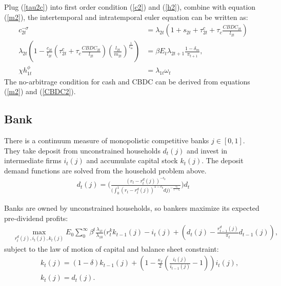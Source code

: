 \documentclass[12pt]{article}
\begin{document}
Plug (\ref{tau2c}) into first order condition (\ref{c2}) and  (\ref{h2}), combine with equation (\ref{m2}), the intertemporal and intratemporal euler equation can be written as: 
\begin{align*}
c_{2t}^{-\sigma} &= \lambda_{2t}(1+s_{2t}+\tau_{2t}^c+\tau_c\frac{CBDC_{2t}}{l_{2t}}) \\
\lambda_{2t}(1-\frac{c_{2t}}{l_{2t}}(\tau_{2t}^c+\tau_c\frac{CBDC_{2t}}{l_{2t}})(\frac{l_{2t}}{m_{2t}})^{\frac{1}{\epsilon_m}}) &= \beta E_t \lambda_{2t+1} \frac{1-\delta_m}{\pi_{t+1}}, \\
\chi h_{1t}^{\phi} &= \lambda_{1t}\omega_t 
\end{align*}
The no-arbitrage condition for cash and CBDC can be derived from equations (\ref{m2}) and (\ref{CBDC2}).

\subsection{Bank}
There is a continuum measure of monopolistic competitive banks $j \in [0,1]$. They take deposit from unconstrained households $d_{t}(j)$ and invest in intermediate firms $i_t(j)$ and accumulate capital stock $k_t(j)$. The deposit demand functions are solved from the household problem above. 
\begin{align*}
d_{t}(j) = \Biggl(\frac{(r_t-r_t^d(j))^{-\epsilon_b}}{\big(\int_0^1(r_t-r_t^d(j))^{1-\epsilon_b}dj\big)^{-\frac{\epsilon_b}{1-\epsilon_b}}}\Biggl)d_{t} 
\end{align*}

Banks are owned by unconstrained households, so bankers maximize its expected pre-dividend profits: 
\begin{align*}
 &\max_{r_t^d(j),i_t(j),k_t(j)}E_0 \sum_0^{\infty}\beta^t\frac{\lambda_{1t}}{\lambda_{10}}(r_t^kk_{t-1}(j)-i_t(j)+(d_{t}(j)-\frac{r_{t-1}^d(j)}{\pi_t}d_{t-1}(j)),
 \end{align*}
subject to the law of motion of capital and balance sheet constraint: 
 \begin{align*}
  \quad & k_t(j) = (1-\delta)k_{t-1}(j)+(1-\frac{\kappa_I}{2}(\frac{i_t(j)}{i_{t-1}(j)}-1))i_t(j), \\
& k_t(j) = d_{t}(j).
\end{align*}
\end{document}
